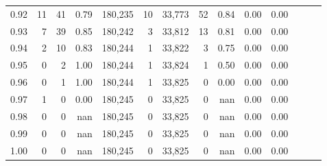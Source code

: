 \begin{tabular}{rrrrrrrrrrrrrr}
0.92 &     11 &   41 &  0.79 &  180,235 &       10 &  33,773 &      52 &  0.84 &  0.00 &      0.00 \\
0.93 &      7 &   39 &  0.85 &  180,242 &        3 &  33,812 &      13 &  0.81 &  0.00 &      0.00 \\
0.94 &      2 &   10 &  0.83 &  180,244 &        1 &  33,822 &       3 &  0.75 &  0.00 &      0.00 \\
0.95 &      0 &    2 &  1.00 &  180,244 &        1 &  33,824 &       1 &  0.50 &  0.00 &      0.00 \\
0.96 &      0 &    1 &  1.00 &  180,244 &        1 &  33,825 &       0 &  0.00 &  0.00 &      0.00 \\
0.97 &      1 &    0 &  0.00 &  180,245 &        0 &  33,825 &       0 &   nan &  0.00 &      0.00 \\
0.98 &      0 &    0 &   nan &  180,245 &        0 &  33,825 &       0 &   nan &  0.00 &      0.00 \\
0.99 &      0 &    0 &   nan &  180,245 &        0 &  33,825 &       0 &   nan &  0.00 &      0.00 \\
1.00 &      0 &    0 &   nan &  180,245 &        0 &  33,825 &       0 &   nan &  0.00 &      0.00 \\
\bottomrule
\end{tabular}
